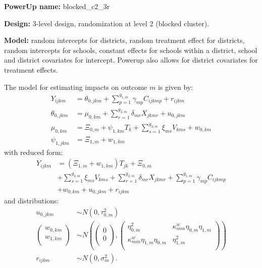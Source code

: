 \documentclass[12pt]{article}
\begin{document}
\textbf{PowerUp name:} blocked\_c2\_3r

\textbf{Design:} 3-level design, randomization at level 2 (blocked cluster).

\textbf{Model:} random intercepts for districts, random treatment effect for districts, random intercepts for schools, constant effects for schools within a district, school and district covariates for intercept. Powerup also allows for district covariates for treatment effects.

The model for estimating impacts on outcome $m$ is given by:
\begin{align}
Y_{ijkm} &=  \theta_{0,jkm} + \sum_{p=1}^{g_{1,m}} \gamma_{mp} C_{ijkmp} + r_{ijkm}\\
\nonumber \theta_{0,jkm} &= \mu_{0,km} + \sum_{r=1}^{g_{2,m}} \delta_{mr} X_{jkmr} + u_{0,jkm}\\
\nonumber \mu_{0,km}  &= \Xi_{0,m} + \psi_{1,km} T_{k} + \sum_{s=1}^{g_{3,m}} \xi_{ms} V_{kms} + w_{0,km} \\
\nonumber \psi_{1,jkm} &= \Xi_{1,m} + w_{1,km}
\end{align}
with reduced form:
\begin{align}
Y_{ijkm} &= \left(\Xi_{1,m} + w_{1,km}\right) T_{jk} + \Xi_{0,m}\\
\nonumber & + \sum_{s=1}^{g_{3,m}} \xi_{ms} V_{kms} + \sum_{r=1}^{g_{2,m}} \delta_{mr} X_{jkmr} + \sum_{p=1}^{g_{1,m}} \gamma_{mp} C_{ijkmp}\\
\nonumber &+ w_{0,km} + u_{0,jkm} + r_{ijkm}
\end{align}
and distributions:
\begin{align}
u_{0,jkm} &\sim N\left(0, \tau^2_{0,m}\right)\\
\nonumber \begin{pmatrix} w_{0, km} \\ w_{1,km}\\ \end{pmatrix} &\sim
N\left(\begin{pmatrix} 0 \\ 0\\ \end{pmatrix}, \begin{pmatrix} \eta^2_{0,m} & \kappa^w_{mm} \eta_{0,m} \eta_{1,m} \\ \kappa^w_{mm} \eta_{1,m} \eta_{0,m} & \eta^2_{1,m} \\ \end{pmatrix}\right) \\
\nonumber r_{ijkm} &\sim N\left(0, \sigma^2_m\right).
\end{align}
\end{document}

